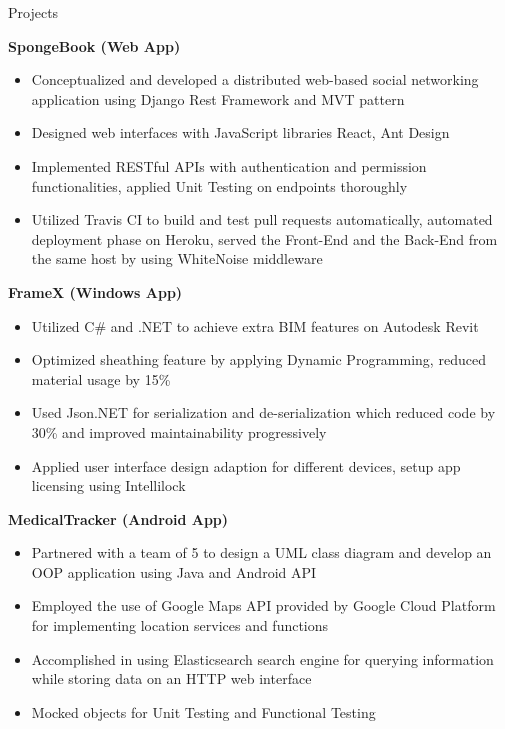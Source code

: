 \documentclass{resume} %
\begin{document}
\begin{rSection}{Projects}

{\bf SpongeBook (Web App)}
\begin{itemize}
\item Conceptualized and developed a distributed web-based social networking application using Django Rest Framework and MVT pattern
\item Designed web interfaces with JavaScript libraries React, Ant Design
\item Implemented RESTful APIs with authentication and permission functionalities, applied Unit Testing on endpoints thoroughly
\item Utilized Travis CI to build and test pull requests automatically, automated deployment phase on Heroku, served the Front-End and the Back-End from the same host by using WhiteNoise middleware
\end{itemize}

{\bf FrameX  (Windows App)}
\begin{itemize}
\item Utilized C\# and .NET to achieve extra BIM features on Autodesk Revit
\item Optimized sheathing feature by applying Dynamic Programming, reduced material usage by 15\%
\item  Used Json.NET for serialization and de-serialization which reduced code by 30\% and improved maintainability progressively
\item Applied user interface design adaption for different devices, setup app licensing using Intellilock
\end{itemize}

{\bf MedicalTracker (Android  App)}
\begin{itemize}
\item Partnered with a team of 5 to design a UML class diagram and develop an OOP application using Java and Android API
\item Employed the use of Google Maps API provided by Google Cloud Platform for implementing location services and functions
\item Accomplished in using Elasticsearch search engine for querying information while storing data on an HTTP web interface
\item Mocked objects for Unit Testing and Functional Testing
\end{itemize}
\end{rSection}
\end{document}
